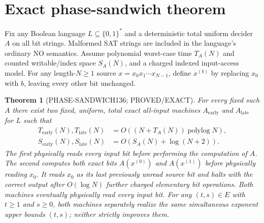 \documentclass[11pt]{article}
\newtheorem{theorem}{Theorem}
\begin{document}
\section{Exact phase-sandwich theorem}
Fix any Boolean language $L\subseteq\{0,1\}^*$ and a
deterministic total uniform decider $A$ on all bit strings.
Malformed SAT strings are included in the language's ordinary
NO semantics. Assume polynomial worst-case time $T_A(N)$ and
counted writable/index space $S_A(N)$, and a charged
indexed input-access model. For any length-$N\ge1$ source
$x=x_0x_1\cdots x_{N-1}$, define $x^{(b)}$ by replacing
$x_0$ with $b$, leaving every other bit unchanged.

\begin{theorem}[PHASE-SANDWICH136; PROVED/EXACT]
For every fixed such $A$ there exist two fixed, uniform,
total exact all-input machines $A_{\mathrm{early}}$ and
$A_{\mathrm{late}}$ for $L$ such that
\[
\begin{aligned}
T_{\mathrm{early}}(N),T_{\mathrm{late}}(N)
  &=O((N+T_A(N))\operatorname{polylog}N),\\
S_{\mathrm{early}}(N),S_{\mathrm{late}}(N)
  &=O(S_A(N)+\log(N+2)).
\end{aligned} \tag{1}
\]
The first physically reads every input bit before performing
the computation of $A$. The second computes both exact
bits $A(x^{(0)})$ and $A(x^{(1)})$ before physically reading
$x_0$. It reads $x_0$ as its \emph{last previously unread}
source bit and halts with the correct output after
$O(\log N)$ further charged elementary bit operations.
Both machines eventually physically read every input bit.
For any $(t,s)\in E$ with $t\ge1$ and $s\ge0$,
both machines separately realize the \emph{same simultaneous
exponent upper bounds} $(t,s)$; neither strictly improves them.
\end{theorem}
\end{document}

